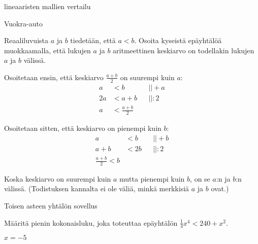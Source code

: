 \begin{tehtava}
lineaaristen mallien vertailu

Vuokra-auto
	\begin{vastaus}
	
	\end{vastaus}
\end{tehtava}

\begin{tehtava}
Reaaliluvuista $a$ ja $b$ tiedetään, että $a<b$. Osoita kyseistä epäyhtälöä muokkaamalla, että lukujen $a$ ja $b$ aritmeettinen keskiarvo on todellakin lukujen $a$ ja $b$ välissä.
	\begin{vastaus}
	Osoitetaan ensin, että keskiarvo $\frac{a+b}{2}$ on suurempi kuin $a$:
	\begin{align*}
	a&<b && ||+a \\
	2a&<a+b && ||:2 \\
	a&<\frac{a+b}{2} && 
	\end{align*}
	
	Osoitetaan sitten, että keskiarvo on pienempi kuin $b$:
	\begin{align*}
	a&<b && ||+b \\
	a+b&<2b && ||:2 \\
	\frac{a+b}{2}<b &&
	\end{align*}
	
	Koska keskiarvo on suurempi kuin $a$ mutta pienempi kuin $b$, on se $a$:n ja $b$:n välissä. (Todistuksen kannalta ei ole väliä, minkä merkkisiä $a$ ja $b$ ovat.) 
	\end{vastaus}
\end{tehtava}

\begin{tehtava}
Toisen asteen yhtälön sovellus
	\begin{vastaus}
	
	\end{vastaus}
\end{tehtava}

%	

\begin{tehtava}
Määritä pienin kokonaisluku, joka toteuttaa epäyhtälön $\frac{1}{4}x^4<240+x^2$.
	\begin{vastaus}
	$x=-5$
	\end{vastaus}
\end{tehtava}

